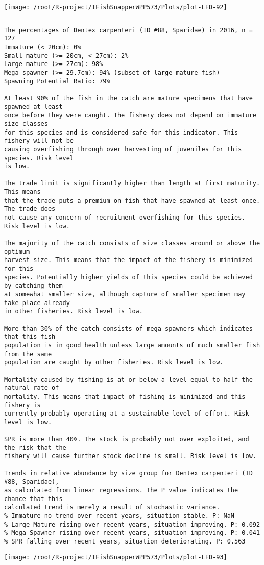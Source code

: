 \documentclass{report}\usepackage[]{graphicx}\usepackage[]{color}
\makeatletter
\def\maxwidth{ %
  \ifdim\Gin@nat@width>\linewidth
    \linewidth
  \else
    \Gin@nat@width
  \fi
}
\newenvironment{kframe}{%
 \def\at@end@of@kframe{}%
 \ifinner\ifhmode%
  \def\at@end@of@kframe{\end{minipage}}%
  \begin{minipage}{\columnwidth}%
 \fi\fi%
 \def\FrameCommand##1{\hskip\@totalleftmargin \hskip-\fboxsep
 \colorbox{shadecolor}{##1}\hskip-\fboxsep
     \hskip-\linewidth \hskip-\@totalleftmargin \hskip\columnwidth}%
 \MakeFramed {\advance\hsize-\width
   \@totalleftmargin\z@ \linewidth\hsize
   \@setminipage}}%
 {\par\unskip\endMakeFramed%
 \at@end@of@kframe}
\newenvironment{knitrout}{}{} %
\makeatother
\begin{document}
\begin{knitrout}
\texttt{[image: /root/R-project/IFishSnapperWPP573/Plots/plot-LFD-92]} 
\begin{kframe}\begin{verbatim}
\end{verbatim}
\end{kframe}
\clearpage
\newpage
\begin{kframe}\begin{verbatim}The percentages of Dentex carpenteri (ID #88, Sparidae) in 2016, n = 127
Immature (< 20cm): 0%
Small mature (>= 20cm, < 27cm): 2%
Large mature (>= 27cm): 98%
Mega spawner (>= 29.7cm): 94% (subset of large mature fish)
Spawning Potential Ratio: 79%
 
At least 90% of the fish in the catch are mature specimens that have spawned at least
once before they were caught. The fishery does not depend on immature size classes
for this species and is considered safe for this indicator. This fishery will not be
causing overfishing through over harvesting of juveniles for this species. Risk level
is low.

The trade limit is significantly higher than length at first maturity.  This means
that the trade puts a premium on fish that have spawned at least once. The trade does
not cause any concern of recruitment overfishing for this species. Risk level is low.

The majority of the catch consists of size classes around or above the optimum
harvest size. This means that the impact of the fishery is minimized for this
species. Potentially higher yields of this species could be achieved by catching them
at somewhat smaller size, although capture of smaller specimen may take place already
in other fisheries. Risk level is low.

More than 30% of the catch consists of mega spawners which indicates that this fish
population is in good health unless large amounts of much smaller fish from the same
population are caught by other fisheries. Risk level is low.
 
Mortality caused by fishing is at or below a level equal to half the natural rate of
mortality. This means that impact of fishing is minimized and this fishery is
currently probably operating at a sustainable level of effort. Risk level is low.
 
SPR is more than 40%. The stock is probably not over exploited, and the risk that the
fishery will cause further stock decline is small. Risk level is low.
 
Trends in relative abundance by size group for Dentex carpenteri (ID #88, Sparidae),
as calculated from linear regressions. The P value indicates the chance that this
calculated trend is merely a result of stochastic variance.
% Immature no trend over recent years, situation stable. P: NaN
% Large Mature rising over recent years, situation improving. P: 0.092
% Mega Spawner rising over recent years, situation improving. P: 0.041
% SPR falling over recent years, situation deteriorating. P: 0.563
\end{verbatim}
\end{kframe}
\texttt{[image: /root/R-project/IFishSnapperWPP573/Plots/plot-LFD-93]} 


\end{knitrout}
\end{document}
